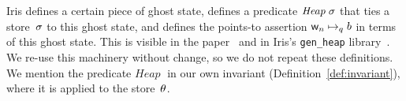 \begin{comment}
A ghost memory cell in Iris is a memory cell that does not exist at runtime.
The ownership and the content of a physical memory cell are described via a
points-to predicate such as $\loc\pointsto\val$. Similarly, the ownership and
content of a ghost cell are described by an Iris assertion, usually written
$\ownGhost\gamma{a}$, where $\gamma$ is the name of the ghost cell and $a$ is
its content. Whereas the content of a physical memory cell is a
programming-language value~$\val$, the content of a ghost cell inhabits a
mathematical structure, a \emph{camera}~\cite[\S4.4]{iris}, which the user
chooses when the ghost cell is created. A camera is equipped with a
composition operation~$\cdot$ and the ghost state assertion satisfies the law
$\ownGhost\gamma{a\cdot b} \equiv \ownGhost\gamma{a} \star
\ownGhost\gamma{b}$. Thus, the choice of a suitable camera determines in what
ways the ghost state can be split.

A key Iris idiom involves the use of the \emph{authoritative
  camera}~\cite[\S6.3.3]{iris} together with an Iris invariant.
The elements of the authoritative camera include
\emph{authoritative elements} $\authfull{c}$ and
\emph{fragmentary elements} $\authfrag{b}$.
The composition law is defined in such a way that
there always exists at most one authoritative element
and the composition of all fragmentary elements in existence is
contained in the authoritative element, etc.
\end{comment}
\newcommand{\genheapinterp}[1]{\mathit{Heap}\;#1}
\newcommand{\pred}[1]{\ownGhost\gammaPred{\authfull{(\mapone\predstore)}}}
\newcommand{\mapone}[1]{1.#1}
\newcommand{\mapsfromexact}[3]{
  \ownGhost\gammaPred{\authfrag{\singletonMap{#1}{(#2, #3)}}}
}
\newcommand{\sh}{L'}
\newcommand{\mapsfromdef}[3]{
  \exists\sh.\;
  \mapsfromexact{#1}{#2}{\sh} \star \pure{\sh \subseteq #3}
}


\begin{assumption}
\label{assumption}
  Iris defines a certain piece of ghost state,
  defines a predicate $\genheapinterp\store$
  that ties a store~$\sigma$ to this ghost state,
  and defines the points-to assertion $\mathsf{w}_n\mathrel{\mapsto_{q}}b$
  in terms of this ghost state.
  This is visible in the paper~\cite[\S6.3.2]{iris}
  and in Iris's \texttt{gen\_heap} library~\cite{genheap}.
  We re-use this machinery without change,
  so we do not repeat these definitions.
  We mention the predicate $\genheapinterp\!$
  in our own invariant (Definition~\ref{def:invariant}),
  where it is applied to the \logical store~$\theta$.
\end{assumption}

